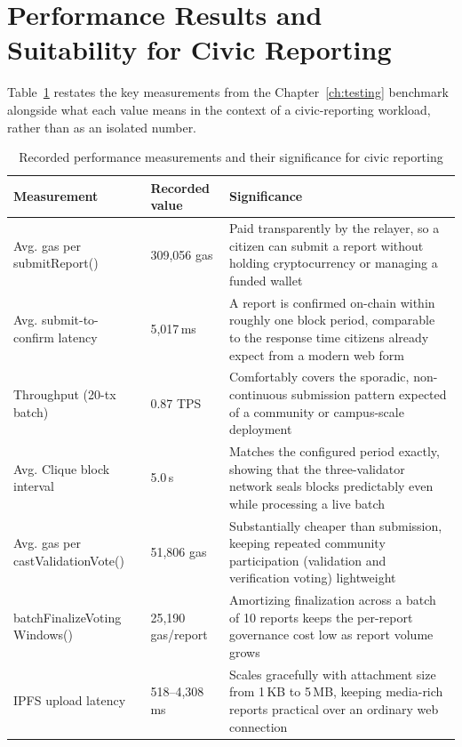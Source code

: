 \section{Performance Results and Suitability for Civic Reporting}
\label{sec:performance-results}

Table~\ref{tab:performance-snapshot} restates the key measurements from the Chapter~\ref{ch:testing} benchmark alongside what each value means in the context of a civic-reporting workload, rather than as an isolated number.

\begin{table}[htbp]
\centering
\caption{Recorded performance measurements and their significance for civic reporting}
\label{tab:performance-snapshot}
\begin{tabular}{p{}|p{}|p{}}
    
    Measurement & Recorded value & Significance \\
    \hline
    Avg. gas per    {submitReport()} & 309{,}056 gas & Paid transparently by the relayer, so a citizen can submit a report without holding cryptocurrency or managing a funded wallet \\
    \hline
    Avg. submit-to-confirm latency & 5{,}017\,ms & A report is confirmed on-chain within roughly one block period, comparable to the response time citizens already expect from a modern web form \\
    \hline
    Throughput (20-tx batch) & 0.87 TPS & Comfortably covers the sporadic, non-continuous submission pattern expected of a community or campus-scale deployment \\
    \hline
    Avg. Clique block interval & 5.0\,s & Matches the configured period exactly, showing that the three-validator network seals blocks predictably even while processing a live batch \\
    \hline
    Avg. gas per castValidationVote() & 51{,}806 gas & Substantially cheaper than submission, keeping repeated community participation (validation and verification voting) lightweight \\
    \hline
       {batchFinalizeVoting Windows()} & 25{,}190 gas/report & Amortizing finalization across a batch of 10 reports keeps the per-report governance cost low as report volume grows \\
    \hline
    IPFS upload latency & 518--4{,}308\,ms & Scales gracefully with attachment size from 1\,KB to 5\,MB, keeping media-rich reports practical over an ordinary web connection \\
    
\end{tabular}
\end{table}

